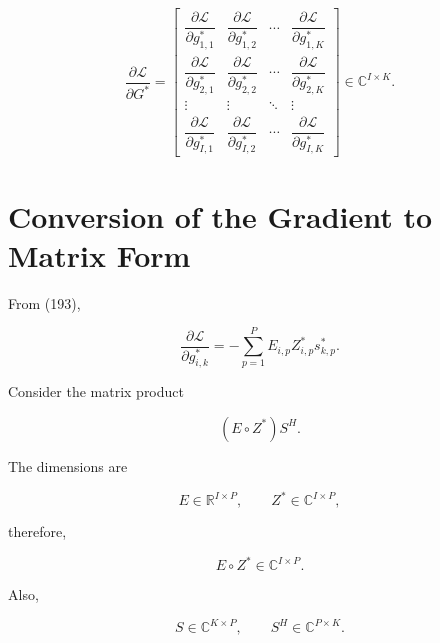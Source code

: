 \documentclass[12pt,a4paper]{article}
\begin{document}
\begin{equation}
\boxed{
\frac{\partial\mathcal{L}}
{\partial G^{*}}
=
\begin{bmatrix}
\dfrac{\partial\mathcal{L}}{\partial g_{1,1}^{*}}
&
\dfrac{\partial\mathcal{L}}{\partial g_{1,2}^{*}}
&
\cdots
&
\dfrac{\partial\mathcal{L}}{\partial g_{1,K}^{*}}
\\
\dfrac{\partial\mathcal{L}}{\partial g_{2,1}^{*}}
&
\dfrac{\partial\mathcal{L}}{\partial g_{2,2}^{*}}
&
\cdots
&
\dfrac{\partial\mathcal{L}}{\partial g_{2,K}^{*}}
\\
\vdots
&
\vdots
&
\ddots
&
\vdots
\\
\dfrac{\partial\mathcal{L}}{\partial g_{I,1}^{*}}
&
\dfrac{\partial\mathcal{L}}{\partial g_{I,2}^{*}}
&
\cdots
&
\dfrac{\partial\mathcal{L}}{\partial g_{I,K}^{*}}
\end{bmatrix}
\in
\mathbb{C}^{I\times K}
}.
\tag{195}
\end{equation}

\section{Conversion of the Gradient to Matrix Form}

From (193),

\begin{equation}
\frac{\partial\mathcal{L}}
{\partial g_{i,k}^{*}}
=
-\sum_{p=1}^{P}
E_{i,p}
Z_{i,p}^{*}
s_{k,p}^{*}.
\tag{196}
\end{equation}

Consider the matrix product

\begin{equation}
(E\circ Z^{*})S^{H}.
\tag{197}
\end{equation}

The dimensions are

\begin{equation}
E\in\mathbb{R}^{I\times P},
\qquad
Z^{*}\in\mathbb{C}^{I\times P},
\tag{198}
\end{equation}

therefore,

\begin{equation}
E\circ Z^{*}
\in
\mathbb{C}^{I\times P}.
\tag{199}
\end{equation}

Also,

\begin{equation}
S\in\mathbb{C}^{K\times P},
\qquad
S^{H}\in\mathbb{C}^{P\times K}.
\tag{200}
\end{equation}
\end{document}
